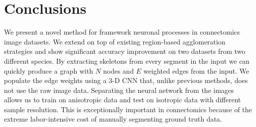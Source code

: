 \section{Conclusions}

We present a novel method for framework neuronal processes in connectomics image datasets.
We extend on top of existing region-based agglomeration strategies and show significant accuracy improvement on two datasets from two different species. 
By extracting skeletons from every segment in the input we can quickly produce a graph with $N$ nodes and $E$ weighted edges from the input. 
We populate the edge weights using a 3-D CNN that, unlike previous methods, does not use the raw image data.
Separating the neural network from the images allows us to train on anisotropic data and test on isotropic data with different sample resolution. 
This is exceptionally important in connectomics because of the extreme labor-intensive cost of manually segmenting ground truth data. 

